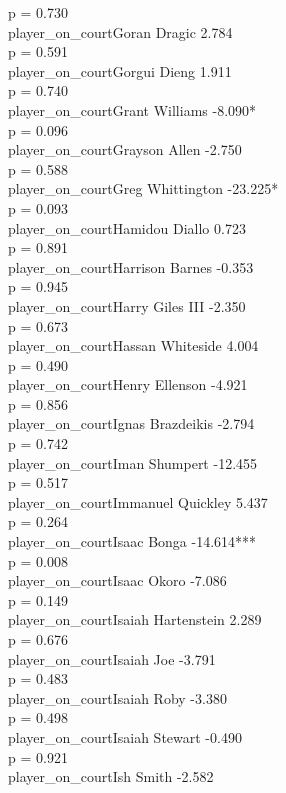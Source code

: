 \documentclass[
  landscape]{article}
\begin{document}
p = 0.730\\
player\_on\_courtGoran Dragic 2.784\\
p = 0.591\\
player\_on\_courtGorgui Dieng 1.911\\
p = 0.740\\
player\_on\_courtGrant Williams -8.090*\\
p = 0.096\\
player\_on\_courtGrayson Allen -2.750\\
p = 0.588\\
player\_on\_courtGreg Whittington -23.225*\\
p = 0.093\\
player\_on\_courtHamidou Diallo 0.723\\
p = 0.891\\
player\_on\_courtHarrison Barnes -0.353\\
p = 0.945\\
player\_on\_courtHarry Giles III -2.350\\
p = 0.673\\
player\_on\_courtHassan Whiteside 4.004\\
p = 0.490\\
player\_on\_courtHenry Ellenson -4.921\\
p = 0.856\\
player\_on\_courtIgnas Brazdeikis -2.794\\
p = 0.742\\
player\_on\_courtIman Shumpert -12.455\\
p = 0.517\\
player\_on\_courtImmanuel Quickley 5.437\\
p = 0.264\\
player\_on\_courtIsaac Bonga -14.614***\\
p = 0.008\\
player\_on\_courtIsaac Okoro -7.086\\
p = 0.149\\
player\_on\_courtIsaiah Hartenstein 2.289\\
p = 0.676\\
player\_on\_courtIsaiah Joe -3.791\\
p = 0.483\\
player\_on\_courtIsaiah Roby -3.380\\
p = 0.498\\
player\_on\_courtIsaiah Stewart -0.490\\
p = 0.921\\
player\_on\_courtIsh Smith -2.582\\
\end{document}
